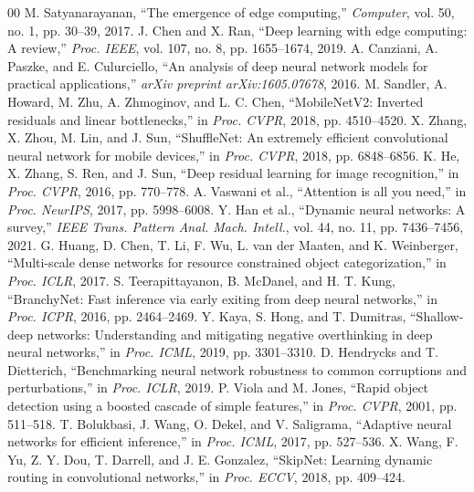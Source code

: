 \documentclass[conference]{IEEEtran}
\begin{document}
\begin{thebibliography}{00}
 M. Satyanarayanan, ``The emergence of edge computing,'' \emph{Computer}, vol. 50, no. 1, pp. 30--39, 2017.
 J. Chen and X. Ran, ``Deep learning with edge computing: A review,'' \emph{Proc. IEEE}, vol. 107, no. 8, pp. 1655--1674, 2019.
 A. Canziani, A. Paszke, and E. Culurciello, ``An analysis of deep neural network models for practical applications,'' \emph{arXiv preprint arXiv:1605.07678}, 2016.
 M. Sandler, A. Howard, M. Zhu, A. Zhmoginov, and L. C. Chen, ``MobileNetV2: Inverted residuals and linear bottlenecks,'' in \emph{Proc. CVPR}, 2018, pp. 4510--4520.
 X. Zhang, X. Zhou, M. Lin, and J. Sun, ``ShuffleNet: An extremely efficient convolutional neural network for mobile devices,'' in \emph{Proc. CVPR}, 2018, pp. 6848--6856.
 K. He, X. Zhang, S. Ren, and J. Sun, ``Deep residual learning for image recognition,'' in \emph{Proc. CVPR}, 2016, pp. 770--778.
 A. Vaswani et al., ``Attention is all you need,'' in \emph{Proc. NeurIPS}, 2017, pp. 5998--6008.
 Y. Han et al., ``Dynamic neural networks: A survey,'' \emph{IEEE Trans. Pattern Anal. Mach. Intell.}, vol. 44, no. 11, pp. 7436--7456, 2021.
 G. Huang, D. Chen, T. Li, F. Wu, L. van der Maaten, and K. Weinberger, ``Multi-scale dense networks for resource constrained object categorization,'' in \emph{Proc. ICLR}, 2017.
 S. Teerapittayanon, B. McDanel, and H. T. Kung, ``BranchyNet: Fast inference via early exiting from deep neural networks,'' in \emph{Proc. ICPR}, 2016, pp. 2464--2469.
 Y. Kaya, S. Hong, and T. Dumitras, ``Shallow-deep networks: Understanding and mitigating negative overthinking in deep neural networks,'' in \emph{Proc. ICML}, 2019, pp. 3301--3310.
 D. Hendrycks and T. Dietterich, ``Benchmarking neural network robustness to common corruptions and perturbations,'' in \emph{Proc. ICLR}, 2019.
 P. Viola and M. Jones, ``Rapid object detection using a boosted cascade of simple features,'' in \emph{Proc. CVPR}, 2001, pp. 511--518.
 T. Bolukbasi, J. Wang, O. Dekel, and V. Saligrama, ``Adaptive neural networks for efficient inference,'' in \emph{Proc. ICML}, 2017, pp. 527--536.
 X. Wang, F. Yu, Z. Y. Dou, T. Darrell, and J. E. Gonzalez, ``SkipNet: Learning dynamic routing in convolutional networks,'' in \emph{Proc. ECCV}, 2018, pp. 409--424.

\end{thebibliography}
\end{document}

